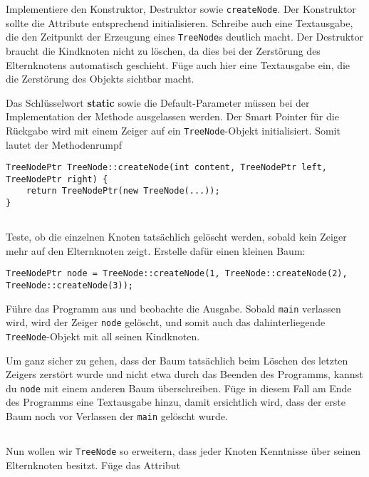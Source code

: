Implementiere den Konstruktor, Destruktor sowie \texttt{createNode}.
Der Konstruktor sollte die Attribute entsprechend initialisieren.
Schreibe auch eine Textausgabe, die den Zeitpunkt der Erzeugung eines \texttt{TreeNode}s deutlich macht.
Der Destruktor braucht die Kindknoten nicht zu löschen, da dies bei der Zerstörung des Elternknotens automatisch geschieht.
Füge auch hier eine Textausgabe ein, die die Zerstörung des Objekts sichtbar macht.

Das Schlüsselwort \textbf{static} sowie die Default-Parameter müssen bei der Implementation der Methode ausgelassen werden.
Der Smart Pointer für die Rückgabe wird mit einem Zeiger auf ein \texttt{TreeNode}-Objekt initialisiert. Somit lautet der Methodenrumpf

\begin{lstlisting}
TreeNodePtr TreeNode::createNode(int content, TreeNodePtr left, TreeNodePtr right) {
	return TreeNodePtr(new TreeNode(...));
}
\end{lstlisting}


\subsection{}
Teste, ob die einzelnen Knoten tatsächlich gelöscht werden, sobald kein Zeiger mehr auf den Elternknoten zeigt.
Erstelle dafür einen kleinen Baum:

\begin{lstlisting}
TreeNodePtr node = TreeNode::createNode(1, TreeNode::createNode(2), TreeNode::createNode(3));
\end{lstlisting}

Führe das Programm aus und beobachte die Ausgabe.
Sobald \texttt{main} verlassen wird, wird der Zeiger \texttt{node} gelöscht, und somit auch das dahinterliegende \texttt{TreeNode}-Objekt mit all seinen Kindknoten.

Um ganz sicher zu gehen, dass der Baum tatsächlich beim Löschen des letzten Zeigers zerstört wurde und nicht etwa durch das Beenden des Programms, kannst du \texttt{node} mit einem anderen Baum überschreiben.
Füge in diesem Fall am Ende des Programms eine Textausgabe hinzu, damit ersichtlich wird, dass der erste Baum noch vor Verlassen der \texttt{main} gelöscht wurde.

\subsection{}
Nun wollen wir \texttt{TreeNode} so erweitern, dass jeder Knoten Kenntnisse über seinen Elternknoten besitzt.
Füge das Attribut

